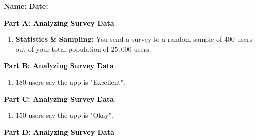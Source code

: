 \documentclass[12pt, letterpaper, fleqn]{article}
\begin{document}
\textbf{Name:} \underline{\hspace{5cm}}
\hfill
\textbf{Date:} \underline{\hspace{3cm}}\\

\begin{tcolorbox}[colback=customteal!20]
\large\textcolor{black}{\textbf{Part A: Analyzing Survey Data}}
\end{tcolorbox}

\vspace{3mm}

\begin{enumerate}[itemsep=5.5cm, leftmargin=0.6cm]
\item \textbf{Statistics \& Sampling:} You send a survey to a random sample of $400$ users out of your total population of $25,000$ users. 
\end{enumerate}

\newpage

\begin{tcolorbox}[colback=customteal!20]
\large\textcolor{black}{\textbf{Part B: Analyzing Survey Data}}
\end{tcolorbox}

\vspace{3mm}

\begin{enumerate}[itemsep=5.5cm, leftmargin=0.6cm, resume]
\item $180$ users say the app is "Excellent".
\end{enumerate}

\newpage

\begin{tcolorbox}[colback=customteal!20]
\large\textcolor{black}{\textbf{Part C: Analyzing Survey Data}}
\end{tcolorbox}

\vspace{3mm}

\begin{enumerate}[itemsep=5.5cm, leftmargin=0.6cm, resume]
\item $150$ users say the app is "Okay".
\end{enumerate}

\newpage

\begin{tcolorbox}[colback=customteal!20]
\large\textcolor{black}{\textbf{Part D: Analyzing Survey Data}}
\end{tcolorbox}
\end{document}
